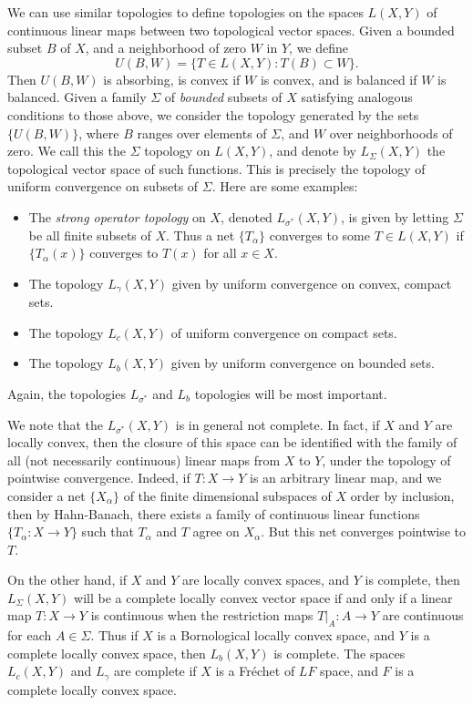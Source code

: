 We can use similar topologies to define topologies on the spaces $L(X,Y)$ of continuous linear maps between two topological vector spaces. Given a bounded subset $B$ of $X$, and a neighborhood of zero $W$ in $Y$, we define
%
\[ U(B,W) = \{ T \in L(X,Y): T(B) \subset W \}. \]
%
Then $U(B,W)$ is absorbing, is convex if $W$ is convex, and is balanced if $W$ is balanced. Given a family $\Sigma$ of \emph{bounded} subsets of $X$ satisfying analogous conditions to those above, we consider the topology generated by the sets $\{ U(B,W) \}$, where $B$ ranges over elements of $\Sigma$, and $W$ over neighborhoods of zero. We call this the $\Sigma$ topology on $L(X,Y)$, and denote by $L_\Sigma(X,Y)$ the topological vector space of such functions. This is precisely the topology of uniform convergence on subsets of $\Sigma$. Here are some examples:
%
\begin{itemize}
    \item The \emph{strong operator topology} on $X$, denoted $L_{\sigma^*}(X,Y)$, is given by letting $\Sigma$ be all finite subsets of $X$. Thus a net $\{ T_\alpha \}$ converges to some $T \in L(X,Y)$ if $\{ T_\alpha(x) \}$ converges to $T(x)$ for all $x \in X$.

    \item The topology $L_\gamma(X,Y)$ given by uniform convergence on convex, compact sets.

    \item The topology $L_c(X,Y)$ of uniform convergence on compact sets.

    \item The topology $L_b(X,Y)$ given by uniform convergence on bounded sets.
\end{itemize}
%
Again, the topologies $L_{\sigma^*}$ and $L_b$ topologies will be most important.

We note that the $L_{\sigma^*}(X,Y)$ is in general not complete. In fact, if $X$ and $Y$ are locally convex, then the closure of this space can be identified with the family of all (not necessarily continuous) linear maps from $X$ to $Y$, under the topology of pointwise convergence. Indeed, if $T: X \to Y$ is an arbitrary linear map, and we consider a net $\{ X_\alpha \}$ of the finite dimensional subspaces of $X$ order by inclusion, then by Hahn-Banach, there exists a family of continuous linear functions $\{ T_\alpha : X \to Y \}$ such that $T_\alpha$ and $T$ agree on $X_\alpha$. But this net converges pointwise to $T$.

On the other hand, if $X$ and $Y$ are locally convex spaces, and $Y$ is complete, then $L_\Sigma(X,Y)$ will be a complete locally convex vector space if and only if a linear map $T: X \to Y$ is continuous when the restriction maps $T|_A : A \to Y$ are continuous for each $A \in \Sigma$. Thus if $X$ is a Bornological locally convex space, and $Y$ is a complete locally convex space, then $L_b(X,Y)$ is complete. The spaces $L_c(X,Y)$ and $L_\gamma$ are complete if $X$ is a Fr\'{e}chet of $LF$ space, and $F$ is a complete locally convex space.

